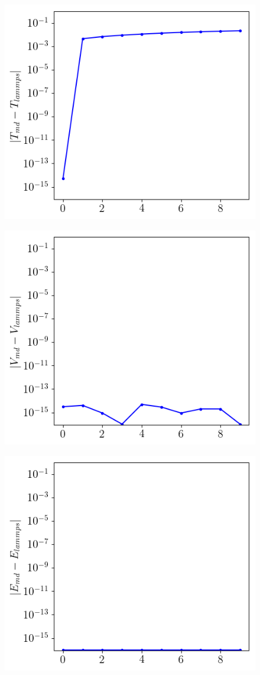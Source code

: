 \documentclass[a4paper, twocolumn]{article}
\begin{document}
\begin{figure}
\centering
\includegraphics[width=0.8\linewidth]{kinetic-energy.png}
\caption{\label{fig:4}}
\end{figure}
\begin{figure}
\centering
\includegraphics[width=0.8\linewidth]{potential-energy.png}
\caption{\label{fig:5}}
\end{figure}
\begin{figure}
\centering
\includegraphics[width=0.8\linewidth]{total-energy.png}
\caption{\label{fig:6}}
\end{figure}
\end{document}
